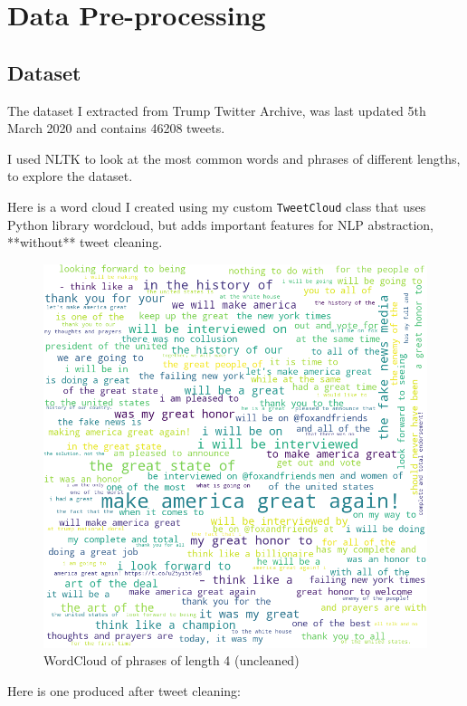 \documentclass{article}
\begin{document}
\newpage
\section{Data Pre-processing}

\subsection{Dataset}

The dataset I extracted from Trump Twitter Archive, was last updated 5th March 2020 and contains 46208 tweets.

I used NLTK to look at the most common words and phrases of different lengths, to explore the dataset.

Here is a word cloud I created using my custom \lstinline{TweetCloud} class that uses Python library wordcloud, but adds important features for NLP abstraction, **without** tweet cleaning.

\begin{figure}[H]
	\includegraphics[width=\linewidth]{images/wordcloud4.png}
	\caption{WordCloud of phrases of length 4 (uncleaned)}
	\label{fig:wd1}
\end{figure}

Here is one produced after tweet cleaning:

\begin{figure}[H]
\end{figure}
\end{document}
